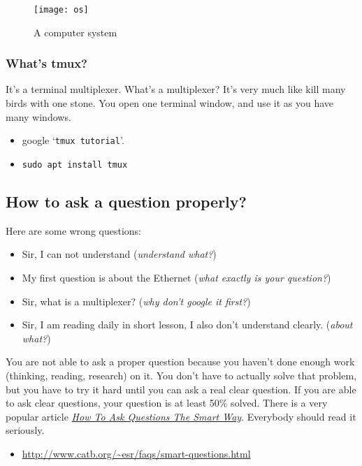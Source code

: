 \documentclass{article}
\begin{document}
\begin{figure}
  \centering
  \texttt{[image: os]}
  \caption{A computer system\label{fig:os}}  
\end{figure}

\subsubsection{What's tmux?}
\label{sec:whats-tmux}

It's a terminal multiplexer. What's a multiplexer? It's very much like kill many birds
with one stone. You open one terminal window, and use it as you have many windows.
\begin{itemize}
\item google `\texttt{tmux tutorial}'. 
\item \texttt{sudo apt install tmux}
\end{itemize}

\subsection{How to ask a question properly?}
\label{sec:how-ask-question}

Here are some wrong questions:
\begin{itemize}
\item Sir, I can not understand (\emph{understand what?})
\item My first question is about the Ethernet (\emph{what exactly is your question?})
\item Sir, what is a multiplexer? (\emph{why don't google it first?})
\item Sir, I am reading daily in short lesson, I also don’t understand clearly. (\emph{about what?})
\end{itemize}

You are not able to ask a proper question because you haven't done enough work (thinking,
reading, research) on it. You don't have to actually solve that problem, but you have to
try it hard until you can ask a real clear question. If you are able to ask clear
questions, your question is at least 50\% solved. There is a very popular article
\href{http://www.catb.org/~esr/faqs/smart-questions.html}{\emph{How To Ask Questions The
    Smart Way}}. Everybody should read it seriously.
\begin{itemize}
\item \url{http://www.catb.org/~esr/faqs/smart-questions.html}
\end{itemize}
\end{document}

